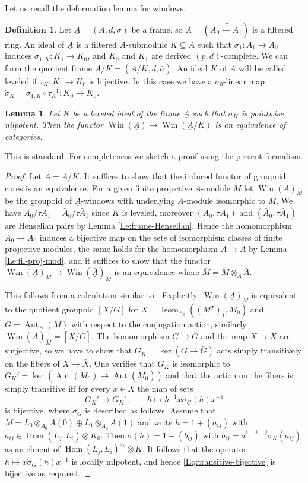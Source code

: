 \documentclass[a4paper,11pt]{amsart}
\theoremstyle{plain}
\newtheorem{Lemma}[equation]{Lemma}
\theoremstyle{definition}
\newtheorem{Defn}[equation]{Definition}
\theoremstyle{remark}
\newcommand{\bLe}{\begin{Lemma}}
\newcommand{\eLe}{\end{Lemma}}
\newcommand{\bDe}{\begin{Defn}}
\newcommand{\eDe}{\end{Defn}}
\newcommand{\bproof}{\begin{proof}}
\newcommand{\eproof}{\end{proof}}
\newcommand{\beqn}{\begin{equation}}
\newcommand{\eeqn}{\end{equation}}
\renewcommand{\u}{\underline}
\numberwithin{equation}{section}
\DeclareMathOperator{\Aut}{Aut}
\DeclareMathOperator{\Hom}{Hom}
\DeclareMathOperator{\Isom}{Isom}
\DeclareMathOperator{\Win}{Win}
\begin{document}
Let us recall the deformation lemma for windows.

\bDe
Let $\u A=(A,d,\sigma)$ be a frame, so $A=(A_0\xleftarrow{\:\tau} A_1)$ is a filtered ring. An ideal of $\u A$ is a filtered $A$-submodule $K\subseteq A$ such that $\sigma_1\colon A_1\to A_0$ induces $\sigma_{1,K}\colon K_1\to K_0$, and $K_0$ and $K_1$ are derived $(p,d)$-complete. 
We can form the quotient frame $\u A/K=(A/K,\bar d,\bar\sigma)$.
An ideal $K$ of $\u A$ will be called leveled if $\tau_K\colon K_1\to K_0$ is bijective. In this case we have a $\sigma_0$-linear map 
$\dot\sigma_K=\sigma_{1,K}\circ\tau_K^{-1}\colon K_0\to K_0$.
\eDe

\bLe
\label{Le:deformation-equivaelence-windows}
Let $K$ be a leveled ideal of the frame $\u A$ such that $\dot\sigma_K$ is pointwise nilpotent. Then the functor $\Win(\u A)\to\Win(\u A/K)$ is an equivalence of categories.
\eLe

This is standard. For completeness we sketch a proof using the present formalism.

\bproof
Let $\u{\bar A}=\u A/K$.
It suffices to show that the induced functor of groupoid cores is an equivalence.
For a given finite projective $A$-module $M$ let $\Win(\u A)_M$ be the groupoid of $\u A$-windows with underlying $A$-module isomorphic to $M$.
We have $A_0/\tau A_1=\bar A_0/\tau\bar A_1$ since $K$ is leveled, moreover $(A_0,\tau A_1)$ and $(\bar A_0,\tau\bar A_1)$ are Henselian pairs by Lemma \ref{Le:frame-Henselian}.
Hence the homomorphism $A_0\to\bar A_0$ induces a bijective map on the sets of isomorphism classes of finite projective modules, the same holds for the homomorphism $A\to\bar A$ by Lemma \ref{Le:fil-proj-mod}, and it suffices to show that the functor $\Win(\u A)_M\to\Win(\u{\bar A})_{\bar M}$ is an equivalence where $\bar M=M\otimes_A\bar A$. 

This follows from a calculation similar to \cite[Proposition 7.1.5]{Lau:Higher}.
Explicitly, $\Win(\u A)_M$ is equivalent to the quotient groupoid $[X/G]$ for $X=\Isom_{A_0}((M^\sigma)_1,M_0)$ and $G=\Aut_A(M)$ with respect to the conjugation action, similarly $\Win(\u{\bar A})_{\bar M}=[\bar X/\bar G]$. The homomorphism $G\to\bar G$ and the map $X\to\bar X$ are surjective, so we have to show that $G_K=\ker(G\to\bar G)$ acts simply transitively on the fibers of $X\to\bar X$. 
One verifies that $G_K$ is isomorphic to $G_K'=\ker(\Aut(M_0)\to\Aut(\bar M_0))$ and that the action on the fibers is simply transitive iff for every $x\in X$ the map of sets
\beqn
\label{Eq:transitive-bijective}
G_K'\to G_K',
\qquad
h\mapsto h^{-1}x\dot\sigma_G(h)x^{-1}
\eeqn
is bijective, where $\dot\sigma_G$ is described as follows. Assume that  $M=L_0\otimes_{A_0}A(0)\oplus L_1\otimes_{A_0}A(1)$ and write $h=1+(a_{ij})$ with $a_{ij}\in\Hom(L_j,L_i)\otimes K_0$. Then $\dot\sigma(h)=1+(b_{ij})$ with $b_{ij}=d^{1+i-j}\dot\sigma_K(a_{ij})$ as an elment of $\Hom(L_j,L_i)^{\sigma_0}\otimes K$. It follows that the operator $h\mapsto x\dot\sigma_G(h)x^{-1}$ is locally nilpotent, and hence \eqref{Eq:transitive-bijective} is bijective as required.
\eproof
\end{document}
